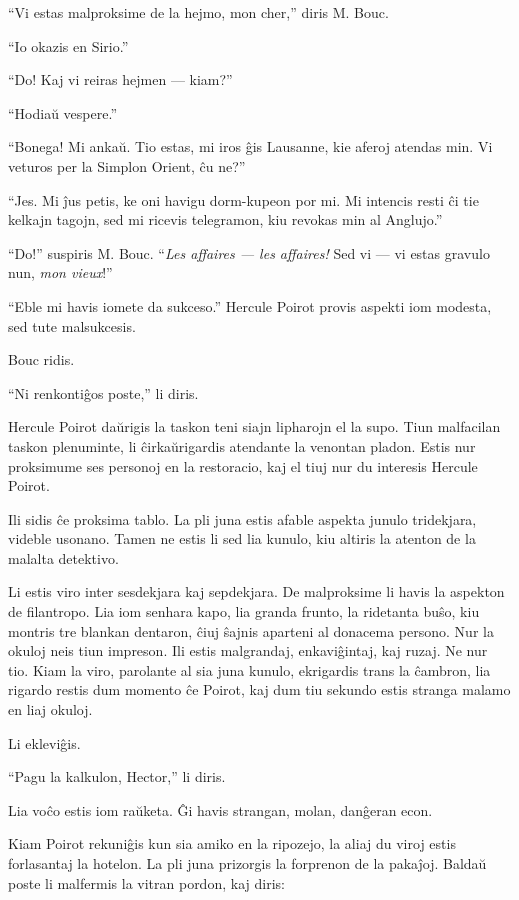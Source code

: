 ``Vi estas malproksime de la hejmo, mon cher,'' diris M. Bouc.

``Io okazis en Sirio.''

``Do! Kaj vi reiras hejmen --- kiam?''

``Hodiaŭ vespere.''

``Bonega! Mi ankaŭ. Tio estas, mi iros ĝis Lausanne, kie aferoj atendas min. Vi veturos per la Simplon Orient, ĉu ne?''

``Jes. Mi ĵus petis, ke oni havigu dorm-kupeon por mi. Mi intencis resti ĉi tie kelkajn tagojn, sed mi ricevis telegramon, kiu revokas min al Anglujo.''

``Do!'' suspiris M. Bouc. ``\emph{Les affaires --- les affaires!} Sed vi --- vi estas gravulo nun, \emph{mon vieux}!''

``Eble mi havis iomete da sukceso.'' Hercule Poirot provis aspekti iom modesta, sed tute malsukcesis.

Bouc ridis.

``Ni renkontiĝos poste,'' li diris.

Hercule Poirot daŭrigis la taskon teni siajn lipharojn el la supo. Tiun malfacilan taskon plenuminte, li ĉirkaŭrigardis atendante la venontan pladon. Estis nur proksimume ses personoj en la restoracio, kaj el tiuj nur du interesis Hercule Poirot.

Ili sidis ĉe proksima tablo. La pli juna estis afable aspekta junulo tridekjara, videble usonano. Tamen ne estis li sed lia kunulo, kiu altiris la atenton de la malalta detektivo.

Li estis viro inter sesdekjara kaj sepdekjara. De malproksime li havis la aspekton de filantropo. Lia iom senhara kapo, lia granda frunto, la ridetanta buŝo, kiu montris tre blankan dentaron, ĉiuj ŝajnis aparteni al donacema persono. Nur la okuloj neis tiun impreson. Ili estis malgrandaj, enkaviĝintaj, kaj ruzaj. Ne nur tio. Kiam la viro, parolante al sia juna kunulo, ekrigardis trans la ĉambron, lia rigardo restis dum momento ĉe Poirot, kaj dum tiu sekundo estis stranga malamo en liaj okuloj.

Li ekleviĝis.

``Pagu la kalkulon, Hector,'' li diris.

Lia voĉo estis iom raŭketa. Ĝi havis strangan, molan, danĝeran econ.

Kiam Poirot rekuniĝis kun sia amiko en la ripozejo, la aliaj du viroj estis forlasantaj la hotelon. La pli juna prizorgis la forprenon de la pakaĵoj. Baldaŭ poste li malfermis la vitran pordon, kaj diris:

